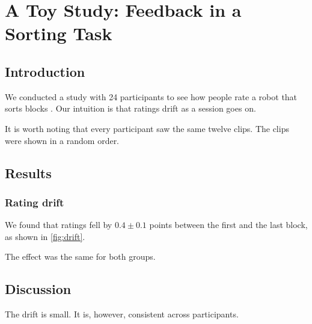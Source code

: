 \chapter{A Toy Study: Feedback in a Sorting Task}
\label{ch:study}

\section{Introduction}

We conducted a study with 24 participants to see how people rate a robot
that sorts blocks \cite{toy2024}. Our intuition is that ratings drift as a session goes on.

It is worth noting that every participant saw the same twelve clips. The clips were
shown in a random order.

\section{Results}

\subsection{Rating drift}

We found that ratings fell by $0.4 \pm 0.1$ points between the first and the last
block, as shown in \autoref{fig:drift}.

The effect was the same for both groups.

\section{Discussion}

The drift is small. It is, however, consistent across participants.
